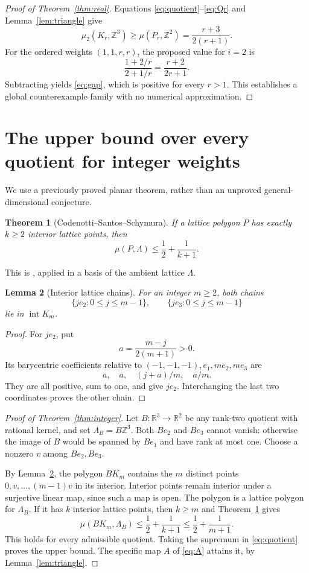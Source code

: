 \documentclass[11pt,a4paper]{article}
\newtheorem{theorem}{Theorem}[section]
\newtheorem{lemma}[theorem]{Lemma}
\theoremstyle{remark}
\DeclareMathOperator{\inter}{int}
\newcommand{\R}{\mathbb R}\newcommand{\Z}{\mathbb Z}
\begin{document}
\begin{proof}[Proof of Theorem~\ref{thm:real}]
Equations \eqref{eq:quotient}--\eqref{eq:Qr} and
Lemma~\ref{lem:triangle} give
\[
 \mu_2(K_r,\Z^3)\ge\mu(P_r,\Z^2)=\frac{r+3}{2(r+1)}.
\]
For the ordered weights $(1,1,r,r)$, the proposed value for $i=2$ is
\[
 \frac{1+2/r}{2+1/r}=\frac{r+2}{2r+1}.
\]
Subtracting yields \eqref{eq:gap}, which is positive for every $r>1$.
This establishes a global counterexample family with no numerical
approximation.
\end{proof}

\section{The upper bound over every quotient for integer weights}
We use a previously proved planar theorem, rather than an unproved
general-dimensional conjecture.

\begin{theorem}[Codenotti--Santos--Schymura]\label{thm:planar}
If a lattice polygon $P$ has exactly $k\ge2$ interior lattice points,
then
\[
 \mu(P,\Lambda)\le\frac12+\frac1{k+1}.
\]
\end{theorem}
This is \cite[Theorem 6.3]{CSS}, applied in a basis of the ambient
lattice $\Lambda$.

\begin{lemma}[Interior lattice chains]\label{lem:chains}
For an integer $m\ge2$, both chains
\[
 \{je_2:0\le j\le m-1\},\qquad
 \{je_3:0\le j\le m-1\}
\]
lie in $\inter K_m$.
\end{lemma}
\begin{proof}
For $je_2$, put
\[
 a=\frac{m-j}{2(m+1)}>0.
\]
Its barycentric coefficients relative to
$(-1,-1,-1),e_1,me_2,me_3$ are
\[
 a,\quad a,\quad (j+a)/m,\quad a/m.
\]
They are all positive, sum to one, and give $je_2$.
Interchanging the last two coordinates proves the other chain.
\end{proof}

\begin{proof}[Proof of Theorem~\ref{thm:integer}]
Let $B:\R^3\to\R^2$ be any rank-two quotient with rational kernel,
and set $\Lambda_B=B\Z^3$. Both $Be_2$ and $Be_3$ cannot vanish:
otherwise the image of $B$ would be spanned by $Be_1$ and have rank
at most one. Choose a nonzero $v$ among $Be_2,Be_3$.

By Lemma~\ref{lem:chains}, the polygon $BK_m$ contains the $m$
distinct points $0,v,\ldots,(m-1)v$ in its interior. Interior points
remain interior under a surjective linear map, since such a map is
open. The polygon is a lattice polygon for $\Lambda_B$.
If it has $k$ interior lattice points, then $k\ge m$ and
Theorem~\ref{thm:planar} gives
\[
 \mu(BK_m,\Lambda_B)\le\frac12+\frac1{k+1}
 \le\frac12+\frac1{m+1}.
\]
This holds for every admissible quotient. Taking the supremum in
\eqref{eq:quotient} proves the upper bound. The specific map $A$ of
\eqref{eq:A} attains it, by Lemma~\ref{lem:triangle}.
\end{proof}
\end{document}
